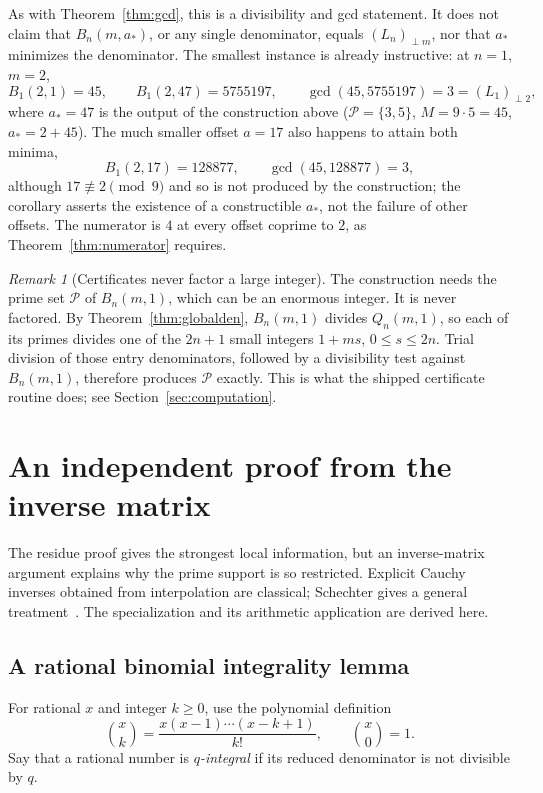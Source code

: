 \documentclass[11pt,a4paper]{article}
\numberwithin{equation}{section}
\theoremstyle{definition}
\theoremstyle{remark}
\newtheorem{remark}[theorem]{Remark}
\begin{document}
As with Theorem~\ref{thm:gcd}, this is a divisibility and gcd statement. It does not claim that $B_n(m,a_*)$, or any single denominator, equals $(L_n)_{\perp m}$, nor that $a_*$ minimizes the denominator. The smallest instance is already instructive: at $n=1$, $m=2$,
\[
 B_1(2,1)=45,\qquad B_1(2,47)=5755197,\qquad
 \gcd(45,5755197)=3=(L_1)_{\perp2},
\]
where $a_*=47$ is the output of the construction above ($\mathcal P=\{3,5\}$, $M=9\cdot5=45$, $a_*=2+45$). The much smaller offset $a=17$ also happens to attain both minima,
\[
 B_1(2,17)=128877,\qquad\gcd(45,128877)=3,
\]
although $17\not\equiv2\pmod 9$ and so is not produced by the construction; the corollary asserts the existence of a constructible $a_*$, not the failure of other offsets. The numerator is $4$ at every offset coprime to $2$, as Theorem~\ref{thm:numerator} requires.

\begin{remark}[Certificates never factor a large integer]\label{rem:primediscovery}
The construction needs the prime set $\mathcal P$ of $B_n(m,1)$, which can be an enormous integer. It is never factored. By Theorem~\ref{thm:globalden}, $B_n(m,1)$ divides $Q_n(m,1)$, so each of its primes divides one of the $2n+1$ small integers $1+ms$, $0\leq s\leq2n$. Trial division of those entry denominators, followed by a divisibility test against $B_n(m,1)$, therefore produces $\mathcal P$ exactly. This is what the shipped certificate routine does; see Section~\ref{sec:computation}.
\end{remark}

\section{An independent proof from the inverse matrix}\label{sec:inverse}

The residue proof gives the strongest local information, but an inverse-matrix argument explains why the prime support is so restricted. Explicit Cauchy inverses obtained from interpolation are classical; Schechter gives a general treatment~\cite{schechter}. The specialization and its arithmetic application are derived here.

\subsection{A rational binomial integrality lemma}
For rational $x$ and integer $k\geq0$, use the polynomial definition
\[
 \binom{x}{k}=\frac{x(x-1)\cdots(x-k+1)}{k!},\qquad \binom{x}{0}=1.
\]
Say that a rational number is \emph{$q$-integral} if its reduced denominator is not divisible by $q$.
\end{document}
